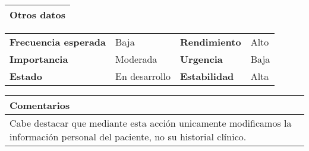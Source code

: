 \documentclass[11pt,a4paper]{article}
\begin{document}
\begin{table}[H]
	\begin{tabularx}{\textwidth}{X}
		\textbf{Otros datos}\\ \hline
	\end{tabularx}
	\begin{tabularx}{\textwidth}{lXlX}
		\textbf{Frecuencia esperada} & Baja & \textbf{Rendimiento} & Alto\\
		\textbf{Importancia} & Moderada & \textbf{Urgencia} & Baja \\
		\textbf{Estado} & En desarrollo & \textbf{Estabilidad} & Alta\\
	\end{tabularx}
	
	\begin{tabularx}{\textwidth}{X}
		\textbf{Comentarios}\\ \hline
		Cabe destacar que mediante esta acción unicamente modificamos la información personal del paciente, no su historial clínico.
	\end{tabularx}
\end{table}

\end{document}
